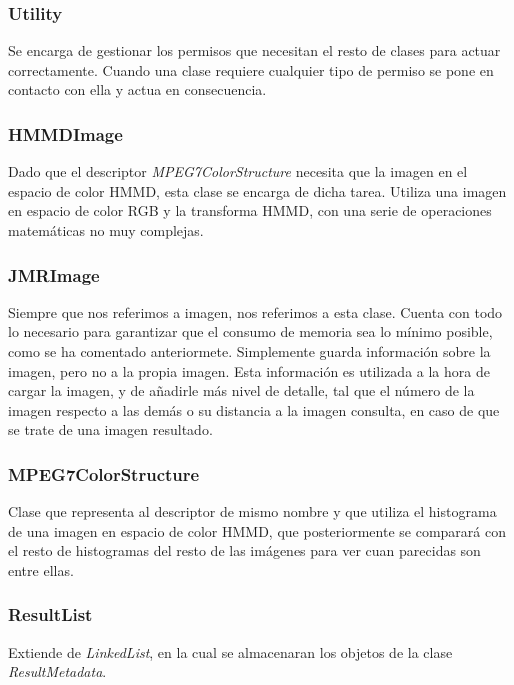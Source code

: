 \subsubsection{Utility}

Se encarga de gestionar los permisos que necesitan el resto de clases para actuar correctamente. Cuando una clase requiere cualquier tipo de permiso se pone en contacto con ella y actua en consecuencia.

\subsubsection{HMMDImage}

Dado que el descriptor \textit{MPEG7ColorStructure} necesita que la imagen en el espacio de color HMMD, esta clase se encarga de dicha tarea. Utiliza una imagen en espacio de color RGB y la transforma HMMD, con una serie de operaciones matemáticas no muy complejas.

\subsubsection{JMRImage}

Siempre que nos referimos a imagen, nos referimos a esta clase. Cuenta con todo lo necesario para garantizar que el consumo de memoria sea lo mínimo posible, como se ha comentado anteriormete. Simplemente guarda información sobre la imagen, pero no a la propia imagen. Esta información es utilizada a la hora de cargar la imagen, y de añadirle más nivel de detalle, tal que el número de la imagen respecto a las demás o su distancia a la imagen consulta, en caso de que se trate de una imagen resultado.

\subsubsection{MPEG7ColorStructure}

Clase que representa al descriptor de mismo nombre y que utiliza el histograma de una imagen en espacio de color HMMD, que posteriormente se comparará con el resto de histogramas del resto de las imágenes para ver cuan parecidas son entre ellas.

\subsubsection{ResultList}

Extiende de \textit{LinkedList}, en la cual se almacenaran los objetos de la clase \textit{ResultMetadata}.

